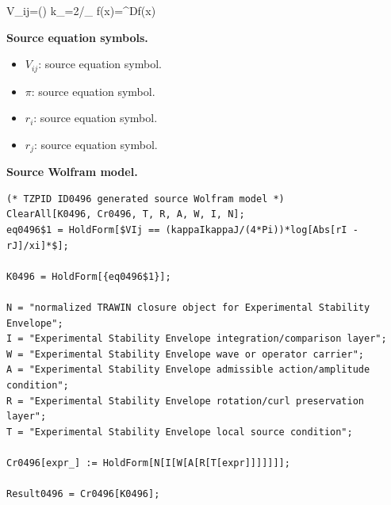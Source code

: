 \tzpequationlinks
  {V_{ij}=\log\left(\right)}
  {k_{}=2\pi/\ell_{}}
  {f(\lambda x)=\lambda^{D}f(x)}

\begin{minipage}[t]{0.49\linewidth}
\begingroup
\small
\raggedright
\textbf{Source equation symbols.}\par
\begin{itemize}[leftmargin=1.35em,itemsep=1pt,topsep=1pt,parsep=0pt]
    \item $V_{ij}$: source equation symbol.
    \item $\pi$: source equation symbol.
    \item $r_i$: source equation symbol.
    \item $r_j$: source equation symbol.
\end{itemize}
\endgroup
\end{minipage}\hfill
\begin{minipage}[t]{0.47\linewidth}
\begingroup
\scriptsize
\raggedright
\textbf{Source Wolfram model.}\par
\begin{Verbatim}[fontsize=\tiny,breaklines=true,breakanywhere=true]
(* TZPID ID0496 generated source Wolfram model *)
ClearAll[K0496, Cr0496, T, R, A, W, I, N];
eq0496$1 = HoldForm[$VIj == (kappaIkappaJ/(4*Pi))*log[Abs[rI - rJ]/xi]*$];

K0496 = HoldForm[{eq0496$1}];

N = "normalized TRAWIN closure object for Experimental Stability Envelope";
I = "Experimental Stability Envelope integration/comparison layer";
W = "Experimental Stability Envelope wave or operator carrier";
A = "Experimental Stability Envelope admissible action/amplitude condition";
R = "Experimental Stability Envelope rotation/curl preservation layer";
T = "Experimental Stability Envelope local source condition";

Cr0496[expr_] := HoldForm[N[I[W[A[R[T[expr]]]]]]];

Result0496 = Cr0496[K0496];
\end{Verbatim}
\endgroup
\end{minipage}

